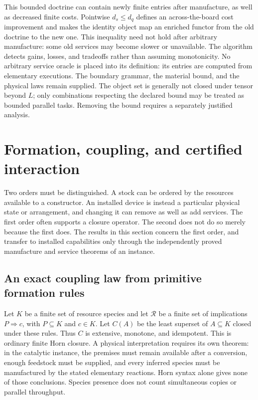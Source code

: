 \documentclass[11pt]{article}
\theoremstyle{definition}
\theoremstyle{remark}
\begin{document}
This bounded doctrine can contain newly finite entries after manufacture, as well as decreased finite costs. Pointwise $d_s\leq d_q$ defines an across-the-board cost improvement and makes the identity object map an enriched functor from the old doctrine to the new one. This inequality need not hold after arbitrary manufacture: some old services may become slower or unavailable. The algorithm detects gains, losses, and tradeoffs rather than assuming monotonicity. No arbitrary service oracle is placed into its definition: its entries are computed from elementary executions. The boundary grammar, the material bound, and the physical laws remain supplied. The object set is generally not closed under tensor beyond $L$; only combinations respecting the declared bound may be treated as bounded parallel tasks. Removing the bound requires a separately justified analysis.


\section{Formation, coupling, and certified interaction}
\label{syn-sec:formation}

Two orders must be distinguished. A stock can be ordered by the resources
available to a constructor. An installed device is instead a particular
physical state or arrangement, and changing it can remove as well as add
services. The first order often supports a closure operator. The second
does not do so merely because the first does. The results in this section
concern the first order, and transfer to installed capabilities only through
the independently proved manufacture and service theorems of an instance.

\subsection{An exact coupling law from primitive formation rules}

Let $K$ be a finite set of resource species and let $\mathcal R$ be a finite
set of implications $P\Rightarrow c$, with $P\subseteq K$ and $c\in K$.
Let $C(A)$ be the least superset of $A\subseteq K$ closed under these rules.
Thus $C$ is extensive, monotone, and idempotent. This is ordinary finite Horn
closure. A physical interpretation requires its own theorem: in the
catalytic instance, the premises must remain available after a conversion,
enough feedstock must be supplied, and every inferred species must be
manufactured by the stated elementary reactions. Horn syntax alone gives
none of those conclusions. Species presence does not count simultaneous
copies or parallel throughput.
\end{document}
